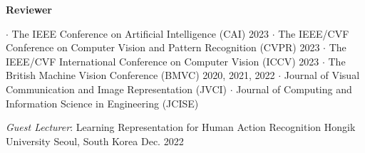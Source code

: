 



\textbf{Reviewer}
\begin{cvskills}
\cvskill
{} %
{\hspace{-3em} \textbf{$\cdot$} The IEEE Conference on Artificial Intelligence (CAI) 2023}
\cvskill
{} %
{\hspace{-3em} \textbf{$\cdot$} The IEEE/CVF Conference on Computer Vision and Pattern Recognition (CVPR) 2023}
\cvskill
{} %
{\hspace{-3em} \textbf{$\cdot$} The IEEE/CVF International Conference on Computer Vision (ICCV) 2023}
\cvskill
{} %
{\hspace{-3em} \textbf{$\cdot$} The British Machine Vision Conference (BMVC) 2020, 2021, 2022}
\cvskill
{} %
{\hspace{-3em} \textbf{$\cdot$} Journal of Visual Communication and Image Representation (JVCI)}
\cvskill
{}
{\hspace{-3em} \textbf{$\cdot$} Journal of Computing and Information Science in Engineering (JCISE)}

\end{cvskills}


\vspace{.5em}

\cventry
{\textit{Guest Lecturer}: Learning Representation for Human Action Recognition}
{Hongik University}
{Seoul, South Korea}
{Dec. 2022}
{}
